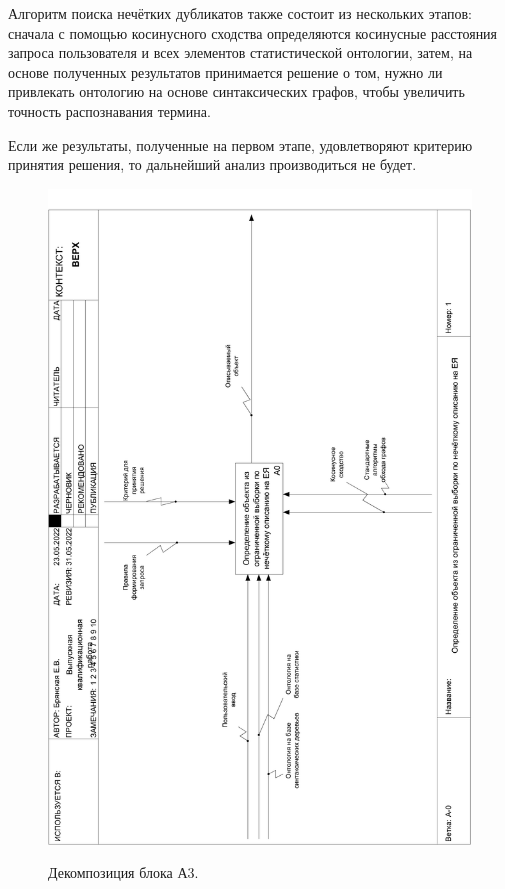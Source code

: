 \newpage

Алгоритм поиска нечётких дубликатов также состоит из нескольких этапов: сначала с помощью косинусного сходства определяются косинусные расстояния запроса пользователя и всех элементов статистической онтологии, затем, на основе полученных результатов принимается решение о том, нужно ли привлекать онтологию на основе синтаксических графов, чтобы увеличить точность распознавания термина. 

Если же результаты, полученные на первом этапе, удовлетворяют критерию принятия решения, то дальнейший анализ производиться не будет. 
\begin{figure}[h]
	\begin{center}
		{\includegraphics[scale = 0.39, angle=-90, page=3]{img/idef0/pdf/general.pdf}}
		\caption{Декомпозиция блока А3.}
		\label{fig22:image}
	\end{center}
\end{figure}

